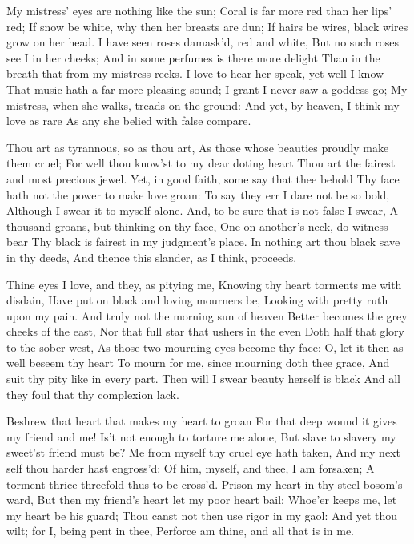 \documentclass[twocolumn]{book}
\begin{document}
My mistress' eyes are nothing like the sun;
Coral is far more red than her lips' red;
If snow be white, why then her breasts are dun;
If hairs be wires, black wires grow on her head.
I have seen roses damask'd, red and white,
But no such roses see I in her cheeks;
And in some perfumes is there more delight
Than in the breath that from my mistress reeks.
I love to hear her speak, yet well I know
That music hath a far more pleasing sound;
I grant I never saw a goddess go;
My mistress, when she walks, treads on the ground:
  And yet, by heaven, I think my love as rare
  As any she belied with false compare.


Thou art as tyrannous, so as thou art,
As those whose beauties proudly make them cruel;
For well thou know'st to my dear doting heart
Thou art the fairest and most precious jewel.
Yet, in good faith, some say that thee behold
Thy face hath not the power to make love groan:
To say they err I dare not be so bold,
Although I swear it to myself alone.
And, to be sure that is not false I swear,
A thousand groans, but thinking on thy face,
One on another's neck, do witness bear
Thy black is fairest in my judgment's place.
  In nothing art thou black save in thy deeds,
  And thence this slander, as I think, proceeds.


Thine eyes I love, and they, as pitying me,
Knowing thy heart torments me with disdain,
Have put on black and loving mourners be,
Looking with pretty ruth upon my pain.
And truly not the morning sun of heaven
Better becomes the grey cheeks of the east,
Nor that full star that ushers in the even
Doth half that glory to the sober west,
As those two mourning eyes become thy face:
O, let it then as well beseem thy heart
To mourn for me, since mourning doth thee grace,
And suit thy pity like in every part.
  Then will I swear beauty herself is black
  And all they foul that thy complexion lack.


Beshrew that heart that makes my heart to groan
For that deep wound it gives my friend and me!
Is't not enough to torture me alone,
But slave to slavery my sweet'st friend must be?
Me from myself thy cruel eye hath taken,
And my next self thou harder hast engross'd:
Of him, myself, and thee, I am forsaken;
A torment thrice threefold thus to be cross'd.
Prison my heart in thy steel bosom's ward,
But then my friend's heart let my poor heart bail;
Whoe'er keeps me, let my heart be his guard;
Thou canst not then use rigor in my gaol:
  And yet thou wilt; for I, being pent in thee,
  Perforce am thine, and all that is in me.
\end{document}
